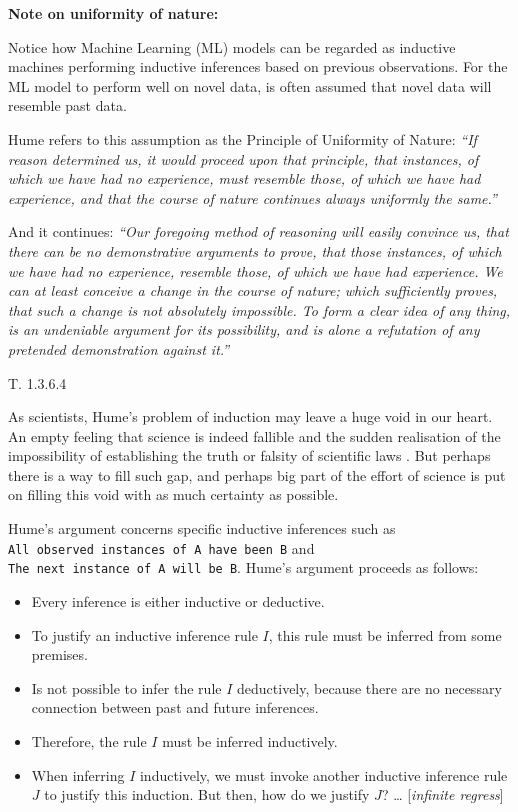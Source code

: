\documentclass[
]{book}
\providecommand{\tightlist}{%
  \setlength{\itemsep}{0pt}\setlength{\parskip}{0pt}}
\begin{document}
\begin{tipbox}

\textbf{Note on uniformity of nature:}

Notice how Machine Learning (ML) models can be regarded as inductive machines performing inductive inferences based on previous observations. For the ML model to perform well on novel data, is often assumed that novel data will resemble past data.

Hume refers to this assumption as the Principle of Uniformity of Nature: \emph{``If reason determined us, it would proceed upon that principle, that instances, of which we have had no experience, must resemble those, of which we have had experience, and that the course of nature continues always uniformly the same.''}

And it continues: \emph{``Our foregoing method of reasoning will easily convince us, that there can be no demonstrative arguments to prove, that those instances, of which we have had no experience, resemble those, of which we have had experience. We can at least conceive a change in the course of nature; which sufficiently proves, that such a change is not absolutely impossible. To form a clear idea of any thing, is an undeniable argument for its possibility, and is alone a refutation of any pretended demonstration against it.''}

\citep{hume1739treatise} T. 1.3.6.4

\end{tipbox}

As scientists, Hume's problem of induction may leave a huge void in our heart. An empty feeling that science is indeed fallible and the sudden realisation of the impossibility of establishing the truth or falsity of scientific laws \citep{rosenberg2019philosophy}. But perhaps there is a way to fill such gap, and perhaps big part of the effort of science is put on filling this void with as much certainty as possible.

Hume's argument concerns specific inductive inferences such as \texttt{All\ observed\ instances\ of\ A\ have\ been\ B} and \texttt{The\ next\ instance\ of\ A\ will\ be\ B}. Hume's argument proceeds as follows:

\begin{itemize}
\tightlist
\item
  Every inference is either inductive or deductive.
\item
  To justify an inductive inference rule \(I\), this rule must be inferred from some premises.
\item
  Is not possible to infer the rule \(I\) deductively, because there are no necessary connection between past and future inferences.
\item
  Therefore, the rule \(I\) must be inferred inductively.
\item
  When inferring \(I\) inductively, we must invoke another inductive inference rule \(J\) to justify this induction. But then, how do we justify \(J\)? \ldots{} {[}\emph{infinite regress}{]}
\end{itemize}
\end{document}
